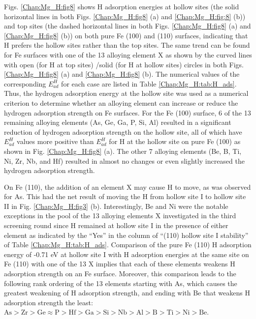 Figs. \ref{Chap:Mg_H:fig8} shows H adsorption energies at hollow sites (the solid horizontal lines in both Figs. \ref{Chap:Mg_H:fig8} (a) and \ref{Chap:Mg_H:fig:8} (b)) and top sites (the dashed horizontal lines in both Figs. \ref{Chap:Mg_H:fig8} (a) and \ref{Chap:Mg_H:fig8} (b)) on both pure Fe (100) and (110) surfaces, indicating that H prefers the hollow sites rather than the top sites. The same trend can be found for Fe surfaces with one of the 13 alloying element X as shown by the curved lines with open (for H at top sites) /solid (for H at hollow sites) circles in both Figs. \ref{Chap:Mg_H:fig8} (a) and \ref{Chap:Mg_H:fig8} (b). The numerical values of the corresponding $E_{ad}^H$ for each case are listed in Table \ref{Chap:Mg_H:tab:H_ads}. Thus, the hydrogen adsorption energy at the hollow site was used as a numerical criterion to determine whether an alloying element can increase or reduce the hydrogen adsorption strength on Fe surfaces. For the Fe (100) surface, 6 of the 13 remaining alloying elements (As, Ge, Ga, P, Si, Al) resulted in a significant reduction of hydrogen adsorption strength on the hollow site, all of which have $E_{ad}^H$ values more positive than $E_{ad}^H$ for H at the hollow site on pure Fe (100) as shown in Fig. \ref{Chap:Mg_H:fig8} (a). The other 7 alloying elements (Be, B, Ti, Ni, Zr, Nb, and Hf) resulted in almost no changes or even slightly increased the hydrogen adsorption strength.


On Fe (110), the addition of an element X may cause H to move, as was observed for As. This had the net result of moving the H from hollow site I to hollow site II in Fig. \ref{Chap:Mg_H:fig3} (b). Interestingly, Be and Ni were the notable exceptions in the pool of the 13 alloying elements X investigated in the third screening round since H remained at hollow site I in the presence of either element as indicated by the ``Yes'' in the column of ``(110) hollow site I stability'' of Table \ref{Chap:Mg_H:tab:H_ads}. Comparison of the pure Fe (110) H adsorption energy of -0.71 eV at hollow site I with H adsorption energies at the same site on Fe (110) with one of the 13 X implies that each of these elements weakens H adsorption strength on an Fe surface. Moreover, this comparison leads to the following rank ordering of the 13 elements starting with As, which causes the greatest weakening of H adsorption strength, and ending with Be that weakens H adsorption strength the least: $\text{As} > \text{Zr} > \text{Ge} \approx \text{P} > \text{Hf} > \text{Ga} > \text{Si} > \text{Nb} > \text{Al} > \text{B} > \text{Ti} > \text{Ni} > \text{Be}$.


